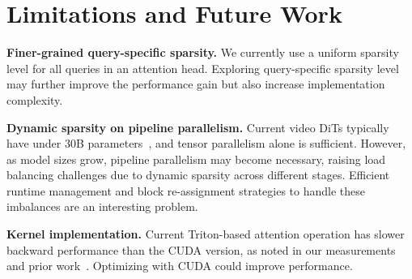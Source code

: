 \section{Limitations and Future Work}

\noindent\textbf{Finer-grained query-specific sparsity.} 
We currently use a uniform sparsity level for all queries in an attention head.
Exploring query-specific sparsity level may further improve the performance gain but also increase implementation complexity.

\noindent\textbf{Dynamic sparsity on pipeline parallelism.} Current video DiTs typically have under 30B parameters~\cite{hong2022cogvideo,yang2024cogvideox,polyak2024movie,OpenSora}, and tensor parallelism alone is sufficient. 
However, as model sizes grow, pipeline parallelism may become necessary, raising load balancing challenges due to dynamic sparsity across different stages. Efficient runtime management and block re-assignment strategies to handle these imbalances are an interesting problem.

\noindent\textbf{Kernel implementation.} Current Triton-based attention operation has slower backward performance than the CUDA version, as noted in our measurements and prior work~\cite{tritonflashattention,dao2023flashattention2}. Optimizing with CUDA could improve performance.
